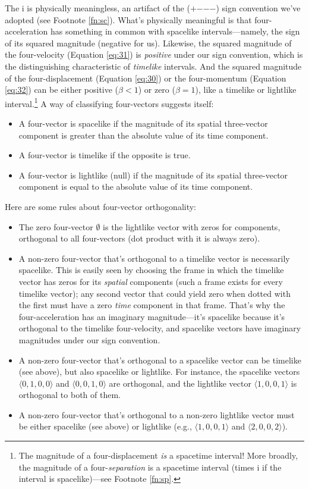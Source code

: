 \documentclass[12pt]{article}
\begin{document}
The $\mathrm{i}$ is physically meaningless, an artifact of the ($+$$-$$-$$-$) sign convention we've adopted (see Footnote \ref{fn:sc}). What's physically meaningful is that four-acceleration has something in common with spacelike intervals---namely, the sign of its squared magnitude (negative for us). Likewise, the squared magnitude of the four-velocity (Equation \ref{eq:31}) is \emph{positive} under our sign convention, which is the distinguishing characteristic of \emph{timelike} intervals. And the squared magnitude of the four-displacement (Equation \ref{eq:30}) or the four-momentum (Equation \ref{eq:32}) can be either positive ($\beta < 1$) or zero ($\beta = 1$), like a timelike or lightlike interval.\footnote{The magnitude of a four-displacement \emph{is} a spacetime interval! More broadly, the magnitude of a four-\emph{separation} is a spacetime interval (times $\mathrm{i}$ if the interval is spacelike)---see Footnote \ref{fn:sp}.} A way of classifying four-vectors suggests itself:
\begin{itemize}
\item A four-vector is spacelike if the magnitude of its spatial three-vector component is greater than the absolute value of its time component.
\item A four-vector is timelike if the opposite is true.
\item A four-vector is lightlike (null) if the magnitude of its spatial three-vector component is equal to the absolute value of its time component.
\end{itemize}
Here are some rules about four-vector orthogonality:
\begin{itemize}
\item The zero four-vector \mbox{\boldmath $\emptyset$} is the lightlike vector with zeros for components, orthogonal to all four-vectors (dot product with it is always zero).
\item A non-zero four-vector that's orthogonal to a timelike vector is necessarily spacelike. This is easily seen by choosing the frame in which the timelike vector has zeros for its \emph{spatial} components (such a frame exists for every timelike vector); any second vector that could yield zero when dotted with the first must have a zero \emph{time} component in that frame. That's why the four-acceleration has an imaginary magnitude---it's spacelike because it's orthogonal to the timelike four-velocity, and spacelike vectors have imaginary magnitudes under our sign convention.
\item A non-zero four-vector that's orthogonal to a spacelike vector can be timelike (see above), but also spacelike or lightlike. For instance, the spacelike vectors $\langle 0, 1, 0, 0 \rangle$ and $\langle 0, 0, 1, 0 \rangle$ are orthogonal, and the lightlike vector $\langle 1, 0, 0, 1 \rangle$ is orthogonal to both of them.
\item A non-zero four-vector that's orthogonal to a non-zero lightlike vector must be either spacelike (see above) or lightlike (e.g., $\langle 1, 0, 0, 1 \rangle$ and $\langle 2, 0, 0, 2 \rangle$).
\end{itemize}
\end{document}
